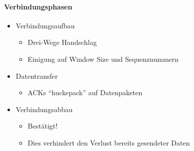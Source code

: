             
            \paragraph{Verbindungsphasen}
                \begin{itemize}
                	\item Verbindungsaufbau
	                	\begin{itemize}
	                		\item Drei-Wege Handschlag
	                		\item Einigung auf Window Size und Sequenznummern
	                	\end{itemize}
                	\item Datentransfer
	                	\begin{itemize}
		                	\item ACKs \enquote{huckepack} auf Datenpaketen
	                	\end{itemize}
                	\item Verbindungsabbau
	                	\begin{itemize}
	                		\item Bestätigt!
	                		\item Dies verhindert den Verlust bereits gesendeter Daten
	                	\end{itemize}
                \end{itemize}
                
